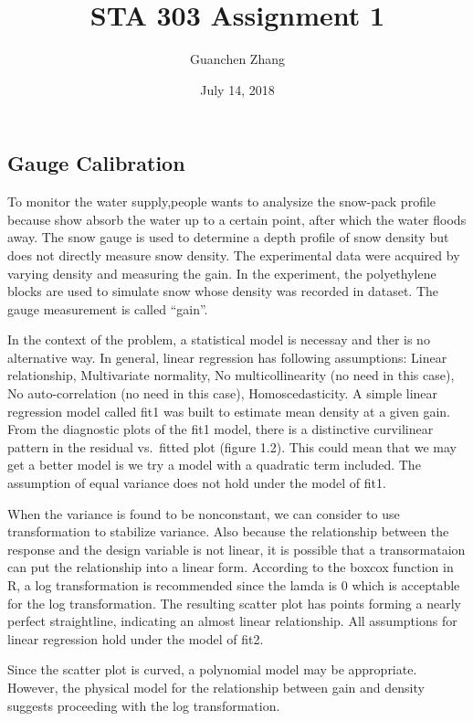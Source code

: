 \documentclass[]{article}
\title{STA 303 Assignment 1}
\author{Guanchen Zhang}
\date{July 14, 2018}
\begin{document}
\maketitle

\fontsize{12}{12} \selectfont

\subsection{Gauge Calibration}\label{gauge-calibration}

To monitor the water supply,people wants to analysize the snow-pack
profile because show absorb the water up to a certain point, after which
the water floods away. The snow gauge is used to determine a depth
profile of snow density but does not directly measure snow density. The
experimental data were acquired by varying density and measuring the
gain. In the experiment, the polyethylene blocks are used to simulate
snow whose density was recorded in dataset. The gauge measurement is
called ``gain''.

In the context of the problem, a statistical model is necessay and ther
is no alternative way. In general, linear regression has following
assumptions: Linear relationship, Multivariate normality, No
multicollinearity (no need in this case), No auto-correlation (no need
in this case), Homoscedasticity. A simple linear regression model called
fit1 was built to estimate mean density at a given gain. From the
diagnostic plots of the fit1 model, there is a distinctive curvilinear
pattern in the residual vs.~fitted plot (figure 1.2). This could mean
that we may get a better model is we try a model with a quadratic term
included. The assumption of equal variance does not hold under the model
of fit1.

When the variance is found to be nonconstant, we can consider to use
transformation to stabilize variance. Also because the relationship
between the response and the design variable is not linear, it is
possible that a transormataion can put the relationship into a linear
form. According to the boxcox function in R, a log transformation is
recommended since the lamda is 0 which is acceptable for the log
transformation. The resulting scatter plot has points forming a nearly
perfect straightline, indicating an almost linear relationship. All
assumptions for linear regression hold under the model of fit2.

Since the scatter plot is curved, a polynomial model may be appropriate.
However, the physical model for the relationship between gain and
density suggests proceeding with the log transformation.
\end{document}
